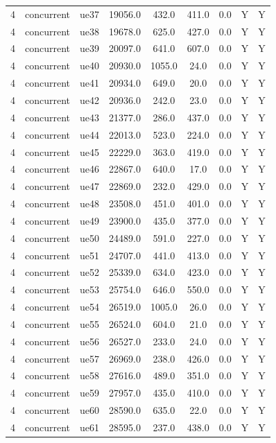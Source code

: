 \begin{table}[ht]
\begin{tabular}{|c|c|c|c|c|c|c|c|c|}
4 & concurrent & ue37 & 19056.0 & 432.0 & 411.0 & 0.0 & Y & Y \\
4 & concurrent & ue38 & 19678.0 & 625.0 & 427.0 & 0.0 & Y & Y \\
4 & concurrent & ue39 & 20097.0 & 641.0 & 607.0 & 0.0 & Y & Y \\
4 & concurrent & ue40 & 20930.0 & 1055.0 & 24.0 & 0.0 & Y & Y \\
4 & concurrent & ue41 & 20934.0 & 649.0 & 20.0 & 0.0 & Y & Y \\
4 & concurrent & ue42 & 20936.0 & 242.0 & 23.0 & 0.0 & Y & Y \\
4 & concurrent & ue43 & 21377.0 & 286.0 & 437.0 & 0.0 & Y & Y \\
4 & concurrent & ue44 & 22013.0 & 523.0 & 224.0 & 0.0 & Y & Y \\
4 & concurrent & ue45 & 22229.0 & 363.0 & 419.0 & 0.0 & Y & Y \\
4 & concurrent & ue46 & 22867.0 & 640.0 & 17.0 & 0.0 & Y & Y \\
4 & concurrent & ue47 & 22869.0 & 232.0 & 429.0 & 0.0 & Y & Y \\
4 & concurrent & ue48 & 23508.0 & 451.0 & 401.0 & 0.0 & Y & Y \\
4 & concurrent & ue49 & 23900.0 & 435.0 & 377.0 & 0.0 & Y & Y \\
4 & concurrent & ue50 & 24489.0 & 591.0 & 227.0 & 0.0 & Y & Y \\
4 & concurrent & ue51 & 24707.0 & 441.0 & 413.0 & 0.0 & Y & Y \\
4 & concurrent & ue52 & 25339.0 & 634.0 & 423.0 & 0.0 & Y & Y \\
4 & concurrent & ue53 & 25754.0 & 646.0 & 550.0 & 0.0 & Y & Y \\
4 & concurrent & ue54 & 26519.0 & 1005.0 & 26.0 & 0.0 & Y & Y \\
4 & concurrent & ue55 & 26524.0 & 604.0 & 21.0 & 0.0 & Y & Y \\
4 & concurrent & ue56 & 26527.0 & 233.0 & 24.0 & 0.0 & Y & Y \\
4 & concurrent & ue57 & 26969.0 & 238.0 & 426.0 & 0.0 & Y & Y \\
4 & concurrent & ue58 & 27616.0 & 489.0 & 351.0 & 0.0 & Y & Y \\
4 & concurrent & ue59 & 27957.0 & 435.0 & 410.0 & 0.0 & Y & Y \\
4 & concurrent & ue60 & 28590.0 & 635.0 & 22.0 & 0.0 & Y & Y \\
4 & concurrent & ue61 & 28595.0 & 237.0 & 438.0 & 0.0 & Y & Y \\

\end{tabular}
\end{table}
